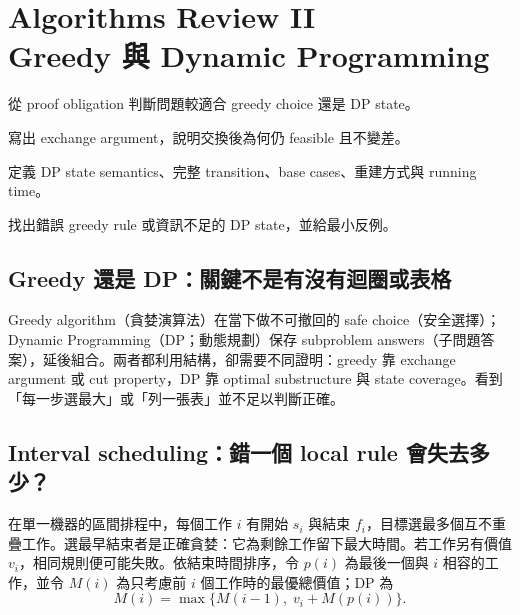 \documentclass[11pt,a4paper,oneside,openany]{book}
\begin{document}
\chapter[Algorithms Review II：Greedy Algorithms 與 Dynamic Programming]
  {Algorithms Review II\\Greedy 與 Dynamic Programming}
\label{ch:greedy-dp}
\begin{chaptermastery}
\item 從 proof obligation 判斷問題較適合 greedy choice 還是 DP state。
\item 寫出 exchange argument，說明交換後為何仍 feasible 且不變差。
\item 定義 DP state semantics、完整 transition、base cases、重建方式與 running time。
\item 找出錯誤 greedy rule 或資訊不足的 DP state，並給最小反例。
\end{chaptermastery}

\section{Greedy 還是 DP：關鍵不是有沒有迴圈或表格}
Greedy algorithm（貪婪演算法）在當下做不可撤回的 safe choice（安全選擇）；Dynamic Programming（DP；動態規劃）保存 subproblem answers（子問題答案），延後組合。兩者都利用結構，卻需要不同證明：greedy 靠 exchange argument 或 cut property，DP 靠 optimal substructure 與 state coverage。看到「每一步選最大」或「列一張表」並不足以判斷正確。

\section{Interval scheduling：錯一個 local rule 會失去多少？}
在單一機器的區間排程中，每個工作 $i$ 有開始 $s_i$ 與結束 $f_i$，目標選最多個互不重疊工作。選最早結束者是正確貪婪：它為剩餘工作留下最大時間。若工作另有價值 $v_i$，相同規則便可能失敗。依結束時間排序，令 $p(i)$ 為最後一個與 $i$ 相容的工作，並令 $M(i)$ 為只考慮前 $i$ 個工作時的最優總價值；DP 為
\begin{equation}
 M(i)=\max\{M(i-1),\;v_i+M(p(i))\}.
 \label{eq:weighted-interval}
\end{equation}
\end{document}
